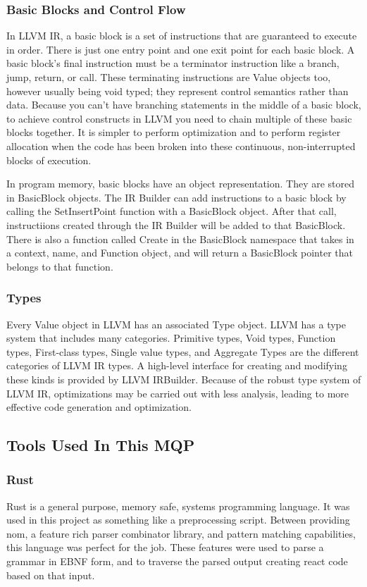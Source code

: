 \documentclass[hidelinks,12pt]{article}
\begin{document}
\begin{doublespacing}
\subsubsection*{Basic Blocks and Control Flow}
In LLVM IR, a basic block is a set of instructions that are guaranteed to execute in order. There is just one entry point and one exit point for each basic block. A basic block's final instruction must be a terminator instruction like a branch, jump, return, or call. These terminating instructions are Value objects too, however usually being void typed; they represent control semantics rather than data. Because you can't have branching statements in the middle of a basic block, to achieve control constructs in LLVM you need to chain multiple of these basic blocks together. It is simpler to perform optimization and to perform register allocation when the code has been broken into these continuous, non-interrupted blocks of execution.
\cite{noauthor_llvm_2023}


In program memory, basic blocks have an object representation. They are stored in BasicBlock objects. The IR Builder can add instructions to a basic block by calling the SetInsertPoint function with a BasicBlock object. After that call, instructiions created through the IR Builder will be added to that BasicBlock. There is also a function called Create in the BasicBlock namespace that takes in a context, name, and Function object, and will return a BasicBlock pointer that belongs to that function.

\subsubsection*{Types}
Every Value object in LLVM has an associated Type object. LLVM has a type system that includes many categories. Primitive types, Void types, Function types, First-class types, Single value types, and Aggregate Types are the different categories of LLVM IR types.
\cite{noauthor_llvm_2023}
A high-level interface for creating and modifying these kinds is provided by LLVM IRBuilder. Because of the robust type system of LLVM IR, optimizations may be carried out with less analysis, leading to more effective code generation and optimization.
\subsection{Tools Used In This MQP}
\subsubsection*{Rust}
Rust is a general purpose, memory safe, systems programming language. It was used in this project as something like a preprocessing script. Between providing nom, a feature rich parser combinator library, and pattern matching capabilities, this language was perfect for the job. These features were used to parse a grammar in EBNF form, and to traverse the parsed output creating react code based on that input.

\end{doublespacing}
\end{document}
